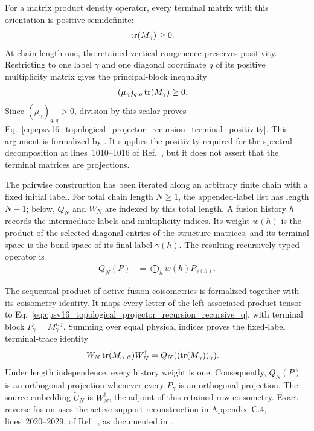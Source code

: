 \documentclass{article}
\begin{document}
For a matrix product density operator, every terminal matrix with this
orientation is positive semidefinite:
\begin{align}
    \operatorname{tr}(M_\gamma)
    &\geq 0.
    \label{eq:cpsv16_topological_projector_recursion_terminal_positivity}
\end{align}
At chain length one, the retained vertical congruence preserves positivity.
Restricting to one label $\gamma$ and one diagonal coordinate $q$ of its
positive multiplicity matrix gives the principal-block inequality
\begin{align}
    (\mu_\gamma)_{q,q}\operatorname{tr}(M_\gamma)
    &\geq 0.
    \label{eq:cpsv16_topological_projector_recursion_weighted_terminal_positivity}
\end{align}
Since $(\mu_\gamma)_{q,q}>0$, division by this scalar proves
Eq.~\ref{eq:cpsv16_topological_projector_recursion_terminal_positivity}.
This argument is formalized by
.
It supplies the positivity required for the spectral decomposition at
lines~1010--1016 of Ref.~\cite{Cirac2016MPDO_arXiv}, but it does not assert
that the terminal matrices are projections.

The pairwise construction has been iterated along an arbitrary finite chain
with a fixed initial label. For total chain length $N\geq1$, the
appended-label list has length $N-1$; below, $Q_N$ and $W_N$ are indexed by
this total length. A fusion history $h$ records the intermediate labels and
multiplicity indices. Its weight $w(h)$ is the product of the selected
diagonal entries of the structure matrices, and its terminal space is the
bond space of its final label $\gamma(h)$. The resulting recursively typed
operator is
\begin{align}
    Q_N(P)
    &=\bigoplus_h w(h)P_{\gamma(h)}.
    \label{eq:cpsv16_topological_projector_recursion_recursive_q}
\end{align}

The sequential product of active fusion coisometries is formalized together
with its coisometry identity. It maps every letter of the left-associated
product tensor to
Eq.~\ref{eq:cpsv16_topological_projector_recursion_recursive_q}, with terminal
block $P_\gamma=M_\gamma^{i,j}$. Summing over equal physical indices proves
the fixed-label terminal-trace identity
\begin{align}
    W_N\operatorname{tr}(M_{\alpha,\boldsymbol\beta})W_N^\dagger
    &=Q_N((\operatorname{tr}(M_\gamma))_\gamma).
    \label{eq:cpsv16_topological_projector_recursion_fixed_label_trace}
\end{align}
Under length independence, every history weight is one. Consequently,
$Q_N(P)$ is an orthogonal projection whenever every $P_\gamma$ is an
orthogonal projection. The source embedding $\widetilde U_N$ is
$W_N^\dagger$, the adjoint of this retained-row coisometry. Exact reverse
fusion uses the active-support reconstruction in Appendix~C.4,
lines~2020--2029, of Ref.~\cite{Cirac2016MPDO_arXiv}, as documented in
.
\end{document}
